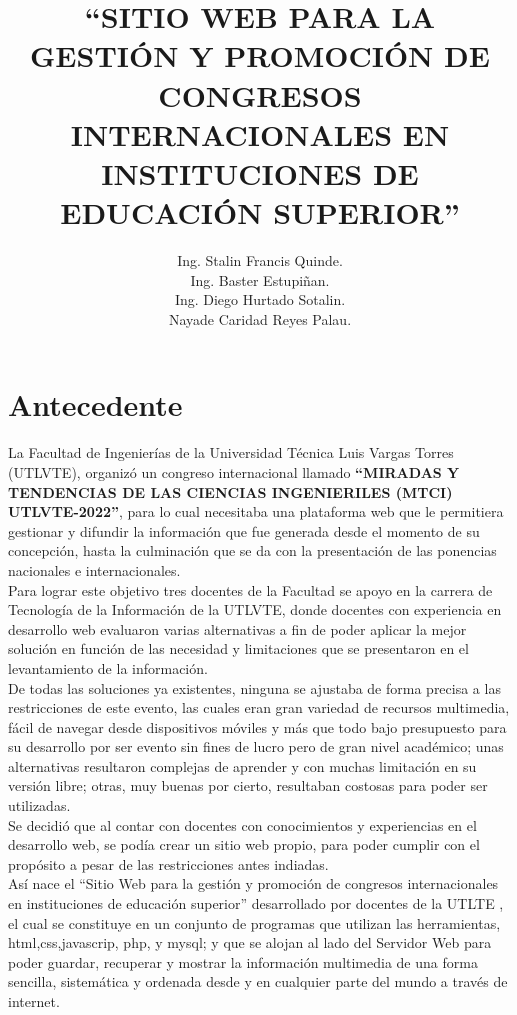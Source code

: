 \documentclass[a4paper,14px]{article}
\title{``SITIO WEB PARA LA GESTIÓN Y PROMOCIÓN DE CONGRESOS INTERNACIONALES EN INSTITUCIONES DE EDUCACIÓN SUPERIOR''}
\author{Ing. Stalin Francis Quinde.\\ Ing. Baster Estupiñan. \\ Ing. Diego Hurtado Sotalin.\\  Nayade Caridad Reyes Palau. }
\begin{document}
\maketitle

\section{Antecedente}
\label{sec:antecedente}
La Facultad de Ingenierías de la Universidad Técnica Luis Vargas Torres (UTLVTE), organizó un congreso internacional llamado \textbf{``MIRADAS Y TENDENCIAS  DE LAS CIENCIAS INGENIERILES (MTCI) UTLVTE-2022''}, para lo cual necesitaba una plataforma web que le permitiera gestionar y difundir la información que  fue generada desde el momento de su concepción, hasta la culminación que se da con la presentación de las ponencias nacionales e internacionales.\\

Para lograr este objetivo tres docentes de la Facultad se apoyo en la carrera de Tecnología de la Información de la UTLVTE, donde docentes con experiencia en desarrollo web evaluaron varias alternativas a fin de poder aplicar la mejor solución en función de las necesidad y limitaciones que se presentaron en el levantamiento de la información.\\

De todas las soluciones ya existentes, ninguna se ajustaba de forma precisa a las restricciones de este evento, las cuales eran  gran variedad de recursos multimedia, fácil de navegar desde dispositivos móviles y  más que todo bajo presupuesto para su desarrollo por ser evento sin fines de lucro pero de gran nivel académico; unas alternativas resultaron complejas de aprender y con muchas limitación en su versión libre; otras, muy buenas por cierto, resultaban costosas para poder ser utilizadas.\\

Se decidió que al contar con docentes con conocimientos y experiencias en el desarrollo web,  se podía crear un  sitio web propio, para poder  cumplir con el propósito a pesar de las restricciones antes indiadas.\\

Así nace el  ``Sitio Web para la gestión y promoción de congresos internacionales en instituciones de educación superior'' desarrollado por docentes de la UTLTE , el cual se constituye en un  conjunto de programas que utilizan las  herramientas,  html,css,javascrip, php, y mysql; y que se alojan al lado del Servidor Web para poder guardar, recuperar y mostrar la información multimedia de una forma sencilla, sistemática y ordenada desde y en cualquier parte del mundo a través de internet.\\
\end{document}
